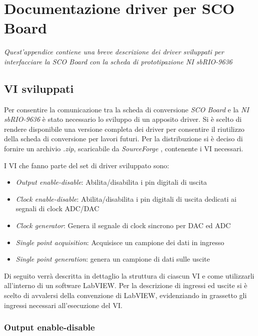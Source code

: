 \chapter{Documentazione driver per SCO Board}
\label{appendiceA}
\thispagestyle{empty}

\textit{Quest'appendice contiene una breve descrizione dei driver sviluppati per interfacciare la SCO Board con la scheda di prototipazione NI sbRIO-9636}

\section*{VI sviluppati} %
Per consentire la comunicazione tra la scheda di conversione \textit{SCO Board} e la \textit{NI sbRIO-9636} è stato necessario lo sviluppo di un apposito driver. Si è scelto di rendere disponibile una versione completa dei driver per consentire il riutilizzo della scheda di conversione per lavori futuri. 
Per la distribuzione si è deciso di fornire un archivio \textit{.zip}, scaricabile da \textit{SourceForge} \cite{sourceforge}, contenente i VI necessari.

I VI che fanno parte del set di driver sviluppato sono:
\begin{itemize}
	\item \textit{Output enable-disable}: Abilita/disabilita i pin digitali di uscita
	\item \textit{Clock enable-disable}: Abilita/disabilita i pin digitali di uscita dedicati ai segnali di clock ADC/DAC
	\item \textit{Clock generator}: Genera il segnale di clock sincrono per DAC ed ADC
	\item \textit{Single point acquisition}: Acquisisce un campione dei dati in ingresso
	\item \textit{Single point generation}: genera un campione di dati sulle uscite
\end{itemize}

Di seguito verrà descritta in dettaglio la struttura di ciascun VI e come utilizzarli all'interno di un software LabVIEW.
Per la descrizione di ingressi ed uscite si è scelto di avvalersi della convenzione di LabVIEW, evidenziando in grassetto gli ingressi necessari all'esecuzione del VI.

\subsection*{Output enable-disable}

